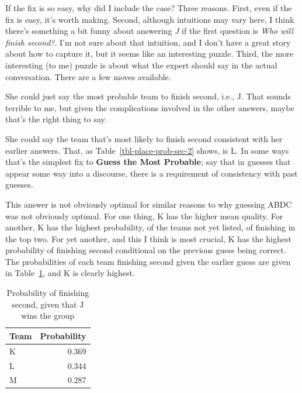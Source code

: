 \documentclass[
  11pt,
  letterpaper,
  DIV=11,
  numbers=noendperiod,
  twoside]{scrartcl}
\begin{document}
If the fix is so easy, why did I include the case? Three reasons. First,
even if the fix is easy, it's worth making. Second, although intuitions
may vary here, I think there's something a bit funny about answering
\emph{J} if the first question is \emph{Who will finish second?}. I'm
not sure about that intuition, and I don't have a great story about how
to capture it, but it seems like an interesting puzzle. Third, the more
interesting (to me) puzzle is about what the expert should say in the
actual conversation. There are a few moves available.

She could just say the most probable team to finish second, i.e., J.
That sounds terrible to me, but given the complications involved in the
other answers, maybe that's the right thing to say.

She could say the team that's most likely to finish second consistent
with her earlier answers. That, as Table~\ref{tbl-place-prob-sec-2}
shows, is L. In some ways that's the simplest fix to \textbf{Guess the
Most Probable}; say that in guesses that appear some way into a
discourse, there is a requirement of consistency with past guesses.

This answer is not obviously optimal for similar reasons to why guessing
ABDC was not obviously optimal. For one thing, K has the higher mean
quality. For another, K has the highest probability, of the teams not
yet listed, of finishing in the top two. For yet another, and this I
think is most crucial, K has the highest probability of finishing second
conditional on the previous guess being correct. The probabilities of
each team finishing second given the earlier guess are given in
Table~\ref{tbl-conditional-second}, and K is clearly highest.

{

\begin{longtable}[]{@{}lr@{}}

\caption{\label{tbl-conditional-second}Probability of finishing second,
given that J wins the group}

\tabularnewline

\toprule\noalign{}
Team & Probability \\
\midrule\noalign{}
\endhead
\bottomrule\noalign{}
\endlastfoot
K & 0.369 \\
L & 0.344 \\
M & 0.287 \\

\end{longtable}

}
\end{document}
